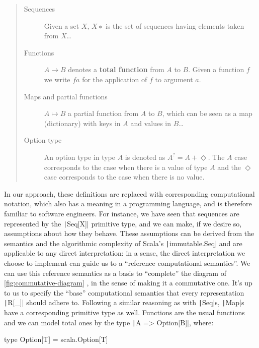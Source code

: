 \documentclass[11pt]{article}
\renewcommand{\vref}[1]{\autoref{#1} \vpageref{#1}}{}
\newcommand{\ScalaI}[1]{\texttt|#1|}
\begin{document}
\begin{quote}
\begin{description}
  \item[Sequences]
  Given a set $X$, $X∗$ is the set of sequences having elements taken from 
  $X$\dots
  
  \item[Functions]
  $A \to B$ denotes a \textbf{total function} from $A$ to $B$. Given a 
  function $f$ we write $f a$ for the application of $f$ to argument $a$.
  
  \item[Maps and partial functions]
  $A \mapsto B$ a partial function from $A$ to $B$, which can be seen as a 
  map (dictionary) with keys in $A$ and values in $B$\dots
  
  \item[Option type]
  An option type in type $A$ is denoted as $A^? = A + \Diamond$. The $A$ case 
  corresponds to the case when there is a value of type $A$ and the 
  $\Diamond$ case corresponds to the case when there is no value.
\end{description}
\end{quote}

In our approach, these definitions are replaced with corresponding 
computational notation, which also has a meaning in a programming language, 
and is therefore familiar to software engineers. For instance, we have seen 
that sequences are represented by the \ScalaI{Seq[X]} primitive type, and we 
can make, if we desire so, assumptions about how they behave. These 
assumptions can be derived from the semantics and the algorithmic complexity 
of Scala's \ScalaI{immutable.Seq} and are applicable to any direct 
interpretation: in a sense, the direct interpretation we choose to implement 
can guide us to a ``reference computational semantics''. We can use this 
reference semantics as a basis to ``complete'' the diagram of 
\vref{fig:commutative-diagram}, in the sense of making it a commutative one. 
It's up to us to specify the ``base'' computational semantics that every 
representation \ScalaI{R[_]} should adhere to.  Following a similar reasoning 
as with \ScalaI{Seq}s, \ScalaI{Map}s have a corresponding primitive type as 
well. Functions are the usual functions and we can model total ones by the 
type \ScalaI{A => Option[B]}, where:

\begin{ScalaBlockSimple}
type Option[T] = scala.Option[T]
\end{ScalaBlockSimple}
\end{document}
